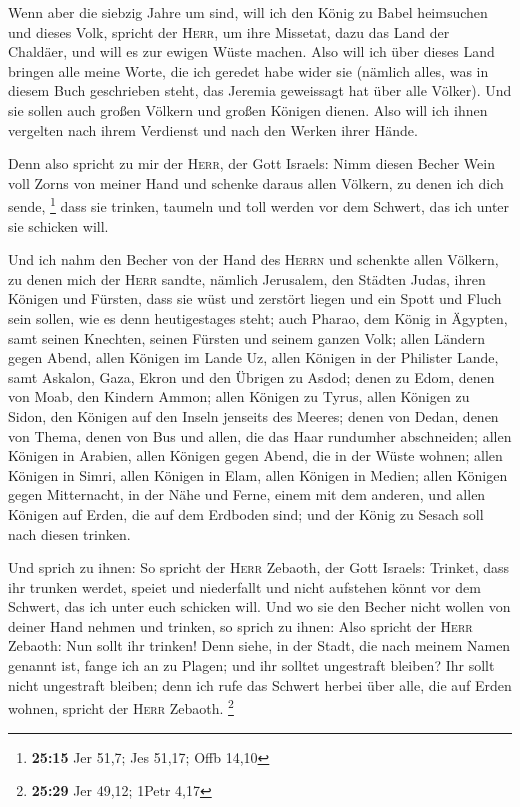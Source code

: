  Wenn aber die siebzig Jahre um sind, will ich den König
zu Babel heimsuchen und dieses Volk, spricht der \textsc{Herr}, um ihre
Missetat, dazu das Land der Chaldäer, und will es zur ewigen Wüste
machen.  Also will ich über dieses Land bringen alle
meine Worte, die ich geredet habe wider sie (nämlich alles, was in
diesem Buch geschrieben steht, das Jeremia geweissagt hat über alle
Völker).  Und sie sollen auch großen Völkern und großen
Königen dienen. Also will ich ihnen vergelten nach ihrem Verdienst und
nach den Werken ihrer Hände.

 Denn also spricht zu mir der \textsc{Herr}, der Gott
Israels: Nimm diesen Becher Wein voll Zorns von meiner Hand und schenke
daraus allen Völkern, zu denen ich dich sende, \footnote{\textbf{25:15}
  Jer 51,7; Jes 51,17; Offb 14,10}  dass sie trinken,
taumeln und toll werden vor dem Schwert, das ich unter sie schicken
will.

 Und ich nahm den Becher von der Hand des \textsc{Herrn}
und schenkte allen Völkern, zu denen mich der \textsc{Herr} sandte,
 nämlich Jerusalem, den Städten Judas, ihren Königen und
Fürsten, dass sie wüst und zerstört liegen und ein Spott und Fluch sein
sollen, wie es denn heutigestages steht;  auch Pharao,
dem König in Ägypten, samt seinen Knechten, seinen Fürsten und seinem
ganzen Volk;  allen Ländern gegen Abend, allen Königen im
Lande Uz, allen Königen in der Philister Lande, samt Askalon, Gaza,
Ekron und den Übrigen zu Asdod;  denen zu Edom, denen von
Moab, den Kindern Ammon;  allen Königen zu Tyrus, allen
Königen zu Sidon, den Königen auf den Inseln jenseits des Meeres;
 denen von Dedan, denen von Thema, denen von Bus und
allen, die das Haar rundumher abschneiden;  allen Königen
in Arabien, allen Königen gegen Abend, die in der Wüste wohnen;
 allen Königen in Simri, allen Königen in Elam, allen
Königen in Medien;  allen Königen gegen Mitternacht, in
der Nähe und Ferne, einem mit dem anderen, und allen Königen auf Erden,
die auf dem Erdboden sind; und der König zu Sesach soll nach diesen
trinken.

 Und sprich zu ihnen: So spricht der \textsc{Herr}
Zebaoth, der Gott Israels: Trinket, dass ihr trunken werdet, speiet und
niederfallt und nicht aufstehen könnt vor dem Schwert, das ich unter
euch schicken will.  Und wo sie den Becher nicht wollen
von deiner Hand nehmen und trinken, so sprich zu ihnen: Also spricht der
\textsc{Herr} Zebaoth: Nun sollt ihr trinken!  Denn
siehe, in der Stadt, die nach meinem Namen genannt ist, fange ich an zu
Plagen; und ihr solltet ungestraft bleiben? Ihr sollt nicht ungestraft
bleiben; denn ich rufe das Schwert herbei über alle, die auf Erden
wohnen, spricht der \textsc{Herr} Zebaoth. \footnote{\textbf{25:29} Jer
  49,12; 1Petr 4,17}

